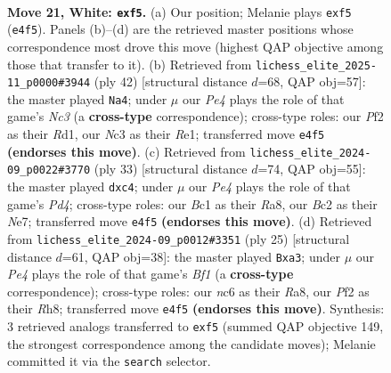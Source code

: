 \documentclass[11pt]{article}
\begin{document}
\clearpage

\begin{figure}[p]\centering
\begin{subfigure}{0.46\textwidth}\centering
\resizebox{\linewidth}{!}{%
\newchessgame
\chessboard[
  setfen={r4r1b/1ppb1k2/p1n3p1/4pp1p/2P1P3/2N2N2/PPB1KPP1/R1B3R1 w - - 0 21},
  showmover=false,
  pgfstyle=straightmove, color=movearrow, markmove={e4-f5}
]}
\caption{}
\end{subfigure}\hfill
\begin{subfigure}{0.46\textwidth}\centering
\resizebox{\linewidth}{!}{%
\newchessgame
\chessboard[
  setfen={r4r2/1b3p1k/p1p1p1pP/3p3n/4P3/2NB4/PPP2PP1/3RR1K1 w - - 1 22},
  showmover=false,
  pgfstyle=straightmove, color=movearrow, markmove={c3-a4}
]}
\caption{}
\end{subfigure}
\\[4pt]
\begin{subfigure}{0.46\textwidth}\centering
\resizebox{\linewidth}{!}{%
\newchessgame
\chessboard[
  setfen={r6r/ppp1nkp1/3b1p2/3p3p/2PP4/P3B2P/1P1N1PP1/2KRR3 b - - 0 17},
  showmover=false,
  pgfstyle=straightmove, color=movearrow, markmove={d5-c4}
]}
\caption{}
\end{subfigure}\hfill
\begin{subfigure}{0.46\textwidth}\centering
\resizebox{\linewidth}{!}{%
\newchessgame
\chessboard[
  setfen={r4b1r/1p3kpp/1np2n2/p3p3/P1p5/N3N1P1/1P1PPP1P/R1B2RK1 b - - 1 13},
  showmover=false,
  pgfstyle=straightmove, color=movearrow, markmove={f8-a3}
]}
\caption{}
\end{subfigure}
\caption{\textbf{Move 21, White: \texttt{exf5}.} (a) Our position; Melanie plays \texttt{exf5} (\texttt{e4f5}). Panels (b)--(d) are the retrieved master positions whose correspondence most drove this move (highest QAP objective among those that transfer to it). (b) Retrieved from \texttt{lichess\_elite\_2025-11\_p0000\#3944} (ply 42) [structural distance $d$=68, QAP obj=57]: the master played \texttt{Na4}; under $\mu$ our \emph{Pe4} plays the role of that game's \emph{Nc3} (a \textbf{cross-type} correspondence); cross-type roles: our \emph{P}f2 as their \emph{R}d1, our \emph{N}c3 as their \emph{R}e1; transferred move \texttt{e4f5} \textbf{(endorses this move)}. (c) Retrieved from \texttt{lichess\_elite\_2024-09\_p0022\#3770} (ply 33) [structural distance $d$=74, QAP obj=55]: the master played \texttt{dxc4}; under $\mu$ our \emph{Pe4} plays the role of that game's \emph{Pd4}; cross-type roles: our \emph{B}c1 as their \emph{R}a8, our \emph{B}c2 as their \emph{N}e7; transferred move \texttt{e4f5} \textbf{(endorses this move)}. (d) Retrieved from \texttt{lichess\_elite\_2024-09\_p0012\#3351} (ply 25) [structural distance $d$=61, QAP obj=38]: the master played \texttt{Bxa3}; under $\mu$ our \emph{Pe4} plays the role of that game's \emph{Bf1} (a \textbf{cross-type} correspondence); cross-type roles: our \emph{n}c6 as their \emph{R}a8, our \emph{P}f2 as their \emph{R}h8; transferred move \texttt{e4f5} \textbf{(endorses this move)}. Synthesis: 3 retrieved analogs transferred to \texttt{exf5} (summed QAP objective 149, the strongest correspondence among the candidate moves); Melanie committed it via the \texttt{search} selector.}
\label{fig:thought-m40}
\end{figure}
\end{document}
